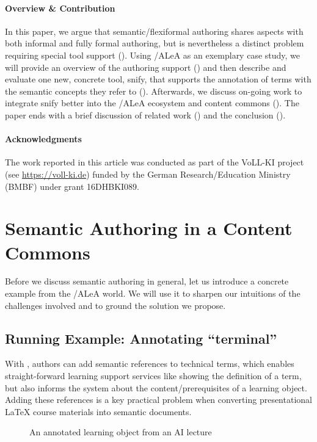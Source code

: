 \documentclass[runningheads]{llncs}
\newcommand\ALeA{\textsf{ALeA}\xspace}
\newcommand\snify{\textsf{snify}\xspace}
\begin{document}
\paragraph{Overview \& Contribution}
In this paper, we argue that semantic/flexiformal authoring shares aspects with both informal and fully formal authoring,
but is nevertheless a distinct problem requiring special tool support ().
Using \sTeX/\ALeA as an exemplary case study,
we will provide an overview of the authoring support ()
and then describe and evaluate one new, concrete tool, \snify, that supports the annotation
of terms with the semantic concepts they refer to ().
Afterwards, we discuss on-going work to integrate \snify better
into the \sTeX/\ALeA ecosystem and content commons ().
The paper ends with a brief discussion of related work () and the conclusion ().


\paragraph{Acknowledgments}
The work reported in this article was conducted as part of the VoLL-KI project (see
\url{https://voll-ki.de}) funded by the German Research/Education Ministry (BMBF) under
grant 16DHBKI089.

\section{Semantic Authoring in a Content Commons}\label{sec:semauth}

Before we discuss semantic authoring in general, let us introduce a concrete example from
the \sTeX/\ALeA world. We will use it to sharpen our intuitions of the challenges
involved and to ground the solution we propose.

\subsection{Running Example: Annotating ``terminal''}
With \sTeX, authors can add semantic references to technical terms,
which enables straight-forward learning support services like
showing the definition of a term, but also informs the system
about the content/prerequisites of a learning object.
Adding these references is a key practical problem when converting presentational {\LaTeX}
course materials into semantic documents.

\begin{figure}[ht]\centering
  \caption{An annotated learning object from an AI lecture}\label{fig:lo}
\end{figure}
\end{document}
